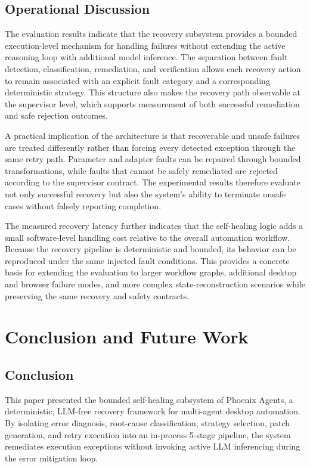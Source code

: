 \documentclass[conference]{IEEEtran}
\begin{document}
\subsection{Operational Discussion}
The evaluation results indicate that the recovery subsystem provides a bounded execution-level mechanism for handling failures without extending the active reasoning loop with additional model inference. The separation between fault detection, classification, remediation, and verification allows each recovery action to remain associated with an explicit fault category and a corresponding deterministic strategy. This structure also makes the recovery path observable at the supervisor level, which supports measurement of both successful remediation and safe rejection outcomes.

A practical implication of the architecture is that recoverable and unsafe failures are treated differently rather than forcing every detected exception through the same retry path. Parameter and adapter faults can be repaired through bounded transformations, while faults that cannot be safely remediated are rejected according to the supervisor contract. The experimental results therefore evaluate not only successful recovery but also the system's ability to terminate unsafe cases without falsely reporting completion.

The measured recovery latency further indicates that the self-healing logic adds a small software-level handling cost relative to the overall automation workflow. Because the recovery pipeline is deterministic and bounded, its behavior can be reproduced under the same injected fault conditions. This provides a concrete basis for extending the evaluation to larger workflow graphs, additional desktop and browser failure modes, and more complex state-reconstruction scenarios while preserving the same recovery and safety contracts.

\section{Conclusion and Future Work}

\subsection{Conclusion}
This paper presented the bounded self-healing subsystem of Phoenix Agents, a deterministic, LLM-free recovery framework for multi-agent desktop automation. By isolating error diagnosis, root-cause classification, strategy selection, patch generation, and retry execution into an in-process 5-stage pipeline, the system remediates execution exceptions without invoking active LLM inferencing during the error mitigation loop.
\end{document}
